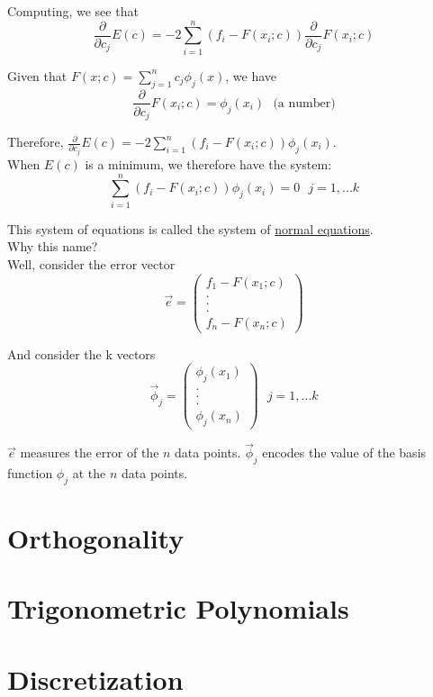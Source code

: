 {Computing, we see that
\begin{equation*}
    \frac{\partial}{\partial c_j} E(c) = -2 \sum_{i=1}^{n} (f_i - F(x_i; c)) \frac{\partial}{\partial c_j} F(x_i; c)
\end{equation*}

Given that $F(x; c) = \sum_{j=1}^{n} c_j \phi_j (x)$, we have
\begin{equation*}
    \frac{\partial}{\partial c_j} F(x_i; c) = \phi_j(x_i)~~~\text{(a number)}
\end{equation*}

Therefore, $\frac{\partial}{\partial c_j} E(c) = -2 \sum_{i=1}^{n} (f_i - F(x_i; c)) \phi_j(x_i)$. \\

When $E(c)$ is a minimum, we therefore have the system:
\begin{equation*}
    \sum_{i=1}^{n} (f_i - F(x_i; c)) \phi_j(x_i) = 0~~~j = 1, ... k
\end{equation*}

This system of equations is called the system of \underline{normal equations}.\\

Why this name? \\

Well, consider the error vector
\begin{equation*}
    \vec{e} = \begin{pmatrix} f_1 - F(x_1; c) \\ . \\ . \\ . \\ f_n - F(x_n; c) \end{pmatrix}
\end{equation*}

And consider the k vectors
\begin{equation*}
    \vec{\phi}_j = \begin{pmatrix} \phi_j(x_1) \\ . \\ . \\ . \\ \phi_j(x_n) \end{pmatrix}~~~j = 1, ... k
\end{equation*}

$\vec{e}$ measures the error of the $n$ data points. $\vec{\phi}_j$ encodes the value of the basis function $\phi_j$ at the $n$ data points.
}

\section{Orthogonality}

\section{Trigonometric Polynomials}

\section{Discretization}